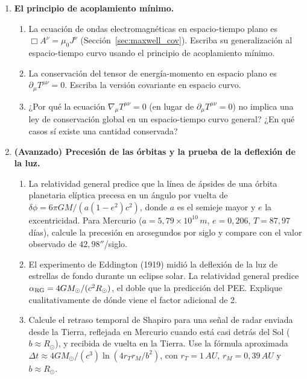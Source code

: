 \begin{enumerate}[leftmargin=2em, label=\textbf{P\thechapter.\arabic*.}]
  \item \textbf{El principio de acoplamiento mínimo.}
  \begin{enumerate}[label=(\alph*)]
    \item La ecuación de ondas electromagnéticas en espacio-tiempo plano es $\Box A^\nu = \mu_0 J^\nu$ (Sección~\ref{sec:maxwell_cov}). Escriba su generalización al espacio-tiempo curvo usando el principio de acoplamiento mínimo.
    \item La conservación del tensor de energía-momento en espacio plano es $\partial_\mu T^{\mu\nu} = 0$. Escriba la versión covariante en espacio curvo.
    \item ¿Por qué la ecuación $\nabla_\mu T^{\mu\nu} = 0$ (en lugar de $\partial_\mu T^{\mu\nu} = 0$) no implica una ley de conservación global en un espacio-tiempo curvo general? ¿En qué casos sí existe una cantidad conservada?
  \end{enumerate}

  \item \textbf{(Avanzado) Precesión de las órbitas y la prueba de la deflexión de la luz.}
  \begin{enumerate}[label=(\alph*)]
    \item La relatividad general predice que la línea de ápsides de una órbita planetaria elíptica precesa en un ángulo por vuelta de $\delta\phi = 6\pi G M/(a(1-e^2)c^2)$, donde $a$ es el semieje mayor y $e$ la excentricidad. Para Mercurio ($a = 5{,}79\times10^{10}\,\si{m}$, $e = 0{,}206$, $T = 87{,}97$ días), calcule la precesión en arcsegundos por siglo y compare con el valor observado de $42{,}98''$/siglo.
    \item El experimento de Eddington (1919) midió la deflexión de la luz de estrellas de fondo durante un eclipse solar. La relatividad general predice $\alpha_{\rm RG} = 4GM_\odot/(c^2 R_\odot)$, el doble que la predicción del PEE. Explique cualitativamente de dónde viene el factor adicional de 2.
    \item Calcule el retraso temporal de Shapiro para una señal de radar enviada desde la Tierra, reflejada en Mercurio cuando está casi detrás del Sol ($b \approx R_\odot$), y recibida de vuelta en la Tierra. Use la fórmula aproximada $\Delta t \approx 4GM_\odot/(c^3)\ln(4r_T r_M/b^2)$, con $r_T = 1\,\si{AU}$, $r_M = 0{,}39\,\si{AU}$ y $b \approx R_\odot$.
  \end{enumerate}


\end{enumerate}
